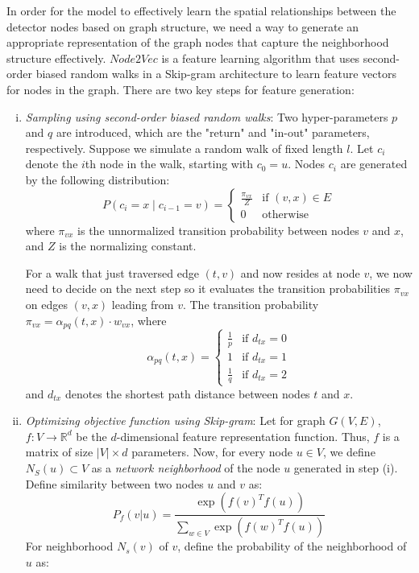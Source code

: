 In order for the model to effectively learn the spatial relationships between the detector nodes based on graph structure, we need a way to generate an appropriate representation of the graph nodes that capture the neighborhood structure effectively. $Node2Vec$\cite{node2vec} is a feature learning algorithm that uses second-order biased random walks in a Skip-gram architecture to learn feature vectors for nodes in the graph. There are two key steps for feature generation:

\begin{enumerate}[(i)]
    \item \textit{Sampling using second-order biased random walks}: Two hyper-parameters \( p \) and \( q \) are introduced, which are the "return" and "in-out" parameters, respectively. Suppose we simulate a random walk of fixed length \( l \). Let \( c_i \) denote the \( i \)th node in the walk, starting with \( c_0 = u \). Nodes \( c_i \) are generated by the following distribution:
    \[
        P(c_i = x \mid c_{i-1} = v) =
        \begin{cases}
        \frac{\pi_{vx}}{Z} & \text{if } (v,x) \in E \\
        0 & \text{otherwise}
        \end{cases}
    \]
    where \( \pi_{vx} \) is the unnormalized transition probability between nodes \( v \) and \( x \), and \( Z \) is the normalizing constant.
    
    For a walk that just traversed edge \( (t,v) \) and now resides at node \( v \), we now need to decide on the next step so it evaluates the transition probabilities \( \pi_{vx} \) on edges \( (v,x) \) leading from \( v \). The transition probability \( \pi_{vx} = \alpha_{pq}(t,x)\cdot w_{vx} \), where 
    \[
        \alpha_{pq}(t,x) = 
        \begin{cases}
        \frac{1}{p}  & \text{if } d_{tx} = 0\\
        1 & \text{if } d_{tx} = 1\\
        \frac{1}{q} & \text{if } d_{tx} = 2
        \end{cases}
    \]
    and \( d_{tx} \) denotes the shortest path distance between nodes \( t \) and \( x \).

    \item \textit{Optimizing objective function using Skip-gram}: Let for graph \( G(V, E) \), \( f: V \rightarrow \mathbb{R}^d \) be the \( d \)-dimensional feature representation function. Thus, \( f \) is a matrix of size \( |V| \times d \) parameters. Now, for every node \( u \in V \), we define \( N_S(u) \subset V \) as a \emph{network neighborhood} of the node \( u \) generated in step (i). Define similarity between two nodes \( u \) and \( v \) as:
    \[
        P_f(v|u) = \frac{\exp(f(v)^T f(u))}{\sum_{w \in V} \exp(f(w)^T f(u))} \tag{1}
    \]
    For neighborhood \( N_s(v) \) of \( v \), define the probability of the neighborhood of \( u \) as:
    

\end{enumerate}
